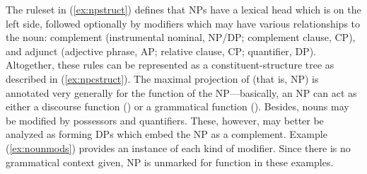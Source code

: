 The ruleset in (\ref{ex:npstruct}) defines that NPs have a lexical head which is
on the left side, followed optionally by modifiers which may
have various relationships to the noun: complement
(instrumental nominal, NP/DP; complement clause, CP), and adjunct
(adjective phrase, AP; relative
clause, CP;
quantifier, DP).
Altogether, these rules can be represented as a constituent-structure tree as
described in (\ref{ex:npcstruct}). The maximal projection of  (that is,
NP) is annotated very generally for the function of the NP---basically, an NP
can act as either a discourse function (\DF{}) or a grammatical function
(\GF{}). Besides, nouns may be modified by possessors
and quantifiers. These, however, may better be analyzed as
forming DPs which embed the NP as a
complement. Example (\ref{ex:nounmods}) provides an instance of each kind of
modifier. Since there is no grammatical context given, NP is unmarked for
function in these examples.

